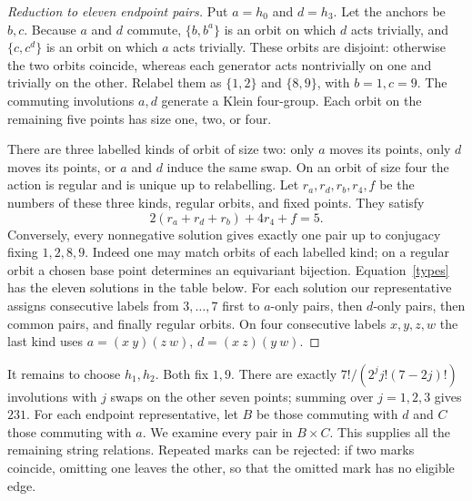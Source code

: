 \documentclass[11pt]{article}
\begin{document}
\begin{proof}[Reduction to eleven endpoint pairs]
Put $a=h_0$ and $d=h_3$. Let the anchors be $b,c$. Because $a$ and $d$
commute, $\{b,b^a\}$ is an orbit on which $d$ acts trivially, and
$\{c,c^d\}$ is an orbit on which $a$ acts trivially. These orbits are disjoint:
otherwise the two orbits coincide, whereas each generator acts nontrivially
on one and trivially on the other. Relabel them as $\{1,2\}$ and $\{8,9\}$,
with $b=1,c=9$. The commuting involutions $a,d$ generate a Klein four-group.
Each orbit on the remaining five points has size one, two, or four.

There are three labelled kinds of orbit of size two: only $a$ moves its
points, only $d$ moves its points, or $a$ and $d$ induce the same swap.
On an orbit of size four the action is regular and is unique up to
relabelling. Let $r_a,r_d,r_b,r_4,f$ be the numbers of these three kinds,
regular orbits, and fixed points. They satisfy
\begin{equation}\label{types}
2(r_a+r_d+r_b)+4r_4+f=5.
\end{equation}
Conversely, every nonnegative solution gives exactly one pair up to
conjugacy fixing $1,2,8,9$. Indeed one may match orbits of each labelled
kind; on a regular orbit a chosen base point determines an equivariant
bijection. Equation~\eqref{types} has the eleven solutions in the table below.
For each solution our representative assigns consecutive labels from
$3,\ldots,7$ first to $a$-only pairs, then $d$-only pairs, then common pairs,
and finally regular orbits. On four consecutive labels $x,y,z,w$ the last
kind uses $a=(x\ y)(z\ w)$, $d=(x\ z)(y\ w)$.
\end{proof}

\noindent It remains to choose $h_1,h_2$. Both fix $1,9$. There are exactly
$7!/(2^j j!(7-2j)!)$ involutions with $j$ swaps on the other seven points;
summing over $j=1,2,3$ gives $231$. For each endpoint representative, let
$B$ be those commuting with $d$ and $C$ those commuting with $a$. We examine
every pair in $B\times C$. This supplies all the remaining string relations.
Repeated marks can be rejected: if two marks coincide, omitting one leaves
the other, so that the omitted mark has no eligible edge.
\end{document}
